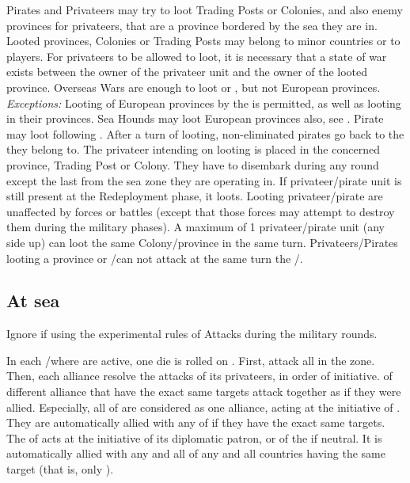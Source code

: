 \begin{todo}
 Pirates and Privateers may try to
loot Trading Posts or Colonies, and also enemy provinces for privateers, that
are a province bordered by the sea they are in.
\bparag Looted provinces, Colonies or Trading Posts may belong to minor
countries or to players. For privateers to be allowed to loot, it is necessary
that a state of war exists between the owner of the privateer unit and the
owner of the looted province. Overseas Wars are enough to loot \TP or \COL,
but not European provinces.
\bparag \textit{Exceptions:} Looting of European provinces by the
\Barbaresques is permitted, as well as looting in their provinces. Sea Hounds
may loot European provinces also, see .
\bparag Pirate may loot following . After a
turn of looting, non-eliminated pirates go back to the \STZ they belong to.
\bparag The privateer intending on looting is placed in the concerned
province, Trading Post or Colony. They have to disembark during any round
except the last from the sea zone they are operating in.
\bparag If privateer/pirate unit is still present at the Redeployment phase,
it loots. Looting privateer/pirate are unaffected by forces or battles (except
that those forces may attempt to destroy them during the military phases).
\bparag A maximum of 1 privateer/pirate unit (any side up) can loot the same
Colony/province in the same turn. Privateers/Pirates looting a province or
\COL/\TP can not attack at the same turn the \CTZ/\STZ.
\end{todo}

\subsection{At sea}
\begin{designnote}
  Ignore if using the experimental rules of Attacks during the military
  rounds.
\end{designnote}

 In each \STZ/\CTZ where
\corsaire are active, one die is rolled on .
\bparag First,  \corsaire attack all \TradeFLEET in the zone.
\bparag Then, each alliance resolve the attacks of its privateers, in order of
initiative.
\bparag \corsaire of different alliance that have the exact same targets
attack together as if they were allied.
\bparag Especially, all \corsaire of \Barbaresques are considered as one
alliance, acting at the initiative of \TUR. They are automatically allied with
any \corsaire of \TUR if they have the exact same targets.
\bparag The \corsaire of \paysChevaliers acts at the initiative of its
diplomatic patron, or of the \SDCF if neutral. It is automatically allied with
any and all \corsaire of any and all countries having the same target (that
is, only \TUR).

